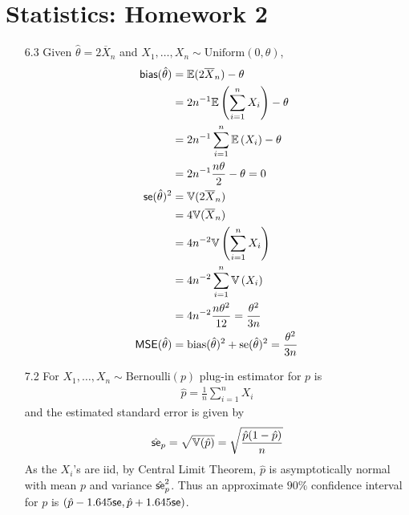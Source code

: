 \documentclass[a4paper,10pt]{article}
\theoremstyle{definition}
\begin{document}
\section*{Statistics: Homework 2}

\begin{enumerate}
\item[6.3] Given $\hat{\theta} = 2\overline{X}_n$ and $X_1, \ldots, X_n \sim \text{Uniform}(0,\theta)$,
\begin{align*}
\text{\sffamily bias}(\hat{\theta}) & =\mathbb{E}(2\overline{X}_n)-\theta\\
& =2n^{-1}\mathbb{E}\left(\sum_{i=1}^{n}{X}_i\right)-\theta\\
& =2n^{-1}\sum_{i=1}^{n}\mathbb{E}\left({X}_i\right)-\theta\\
& =2n^{-1}\frac{n\theta}{2}-\theta=0\\
\text{\sffamily se}(\hat{\theta})^2 & = \mathbb{V}(2\overline{X}_n)\\
& = 4\mathbb{V}(\overline{X}_n)\\
&=4n^{-2}\mathbb{V}\left(\sum_{i=1}^{n}{X}_i\right)\\
&=4n^{-2}\sum_{i=1}^{n}\mathbb{V}\left({X}_i\right)\\
&=4n^{-2}\frac{n\theta^2}{12} = \frac{\theta^2}{3n}\\
\text{\sffamily MSE}(\hat{\theta}) &= \text{bias}(\hat{\theta})^2+\text{se}(\hat{\theta})^2 = \frac{\theta^2}{3n}
\end{align*}
\item[7.2] For $X_1, \ldots, X_n \sim \text{Bernoulli}(p)$ plug-in estimator for $p$ is 
\begin{align*}
\hat{p}=\frac{1}{n}\sum_{i=1}^{n}X_i
\end{align*}
and the estimated standard error is given by
\begin{align*}
\hat{\text{\sffamily se}}_p = \sqrt{\mathbb{V}(\hat{p})} = \sqrt{\frac{\hat{p}(1-\hat{p})}{n} }
\end{align*}
As the $X_i$'s are iid, by Central Limit Theorem, $\hat{p}$ is asymptotically normal with mean $p$ and variance $\hat{\text{\sffamily se}}_p^2$. Thus an approximate $90\%$ confidence interval for $p$ is $(\hat{p}-1.645\text{\sffamily se},\hat{p}+1.645\text{\sffamily se})$.


\end{enumerate}
\end{document}
